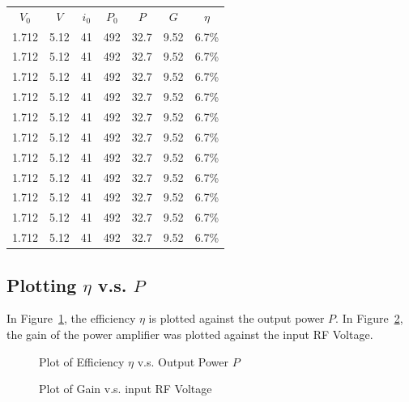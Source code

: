 \begin{tabular}{|c|c|c|c|c|c|c|}
  \hline
  $V_0$   &   $V$   &   $i_0$   &   $P_0$   &   $P$   &   $G$   &   $\eta$\\
  1.712   &   5.12  &   41      &   492     &   32.7  &   9.52  &   6.7\% \\
  1.712   &   5.12  &   41      &   492     &   32.7  &   9.52  &   6.7\% \\
  1.712   &   5.12  &   41      &   492     &   32.7  &   9.52  &   6.7\% \\
  1.712   &   5.12  &   41      &   492     &   32.7  &   9.52  &   6.7\% \\
  1.712   &   5.12  &   41      &   492     &   32.7  &   9.52  &   6.7\% \\
  1.712   &   5.12  &   41      &   492     &   32.7  &   9.52  &   6.7\% \\
  1.712   &   5.12  &   41      &   492     &   32.7  &   9.52  &   6.7\% \\
  1.712   &   5.12  &   41      &   492     &   32.7  &   9.52  &   6.7\% \\
  1.712   &   5.12  &   41      &   492     &   32.7  &   9.52  &   6.7\% \\
  1.712   &   5.12  &   41      &   492     &   32.7  &   9.52  &   6.7\% \\
  1.712   &   5.12  &   41      &   492     &   32.7  &   9.52  &   6.7\% \\
  \hline

\end{tabular}

\subsection{Plotting $\eta$ v.s. $P$}

In Figure~\ref{fig:efficiencyvpower}, the efficiency $\eta$ is plotted against the
output power $P$. In Figure~\ref{fig:gainvRFvolt}, the gain of the power
amplifier was plotted against the input RF Voltage.

\begin{figure}[h!]
  \centering
    \label{fig:efficiencyvpower}
    \caption{Plot of Efficiency $\eta$ v.s. Output Power $P$}
\end{figure}

\begin{figure}[h!]
  \centering
    \label{fig:gainvRFvolt}
    \caption{Plot of Gain v.s. input RF Voltage}
\end{figure}
